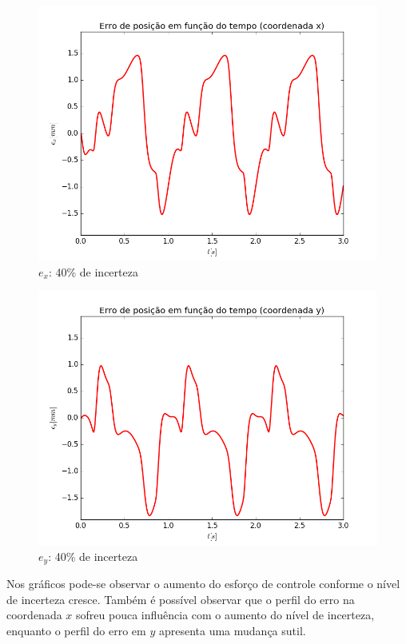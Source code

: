 \documentclass[]{politex}
\begin{document}
\begin{multicols}{2}
\begin{figure}[H]
	\centering
	\includegraphics[scale=0.42]{imagens/40/ex.png}  
	\caption{$e_x$: 40\% de incerteza}
	\label{fig:ex_40}
\end{figure}
\begin{figure}[H]
	\centering
	\includegraphics[scale=0.42]{imagens/40/ey.png}  
	\caption{$e_y$: 40\% de incerteza}
	\label{fig:ey_40}
\end{figure}
\end{multicols}

\newpage

Nos gráficos pode-se observar o aumento do esforço de controle conforme o nível de incerteza cresce. Também é possível observar que o perfil do erro na coordenada $x$  sofreu pouca influência com o aumento do nível de incerteza, enquanto o perfil do erro em $y$ apresenta uma mudança sutil.
\end{document}
